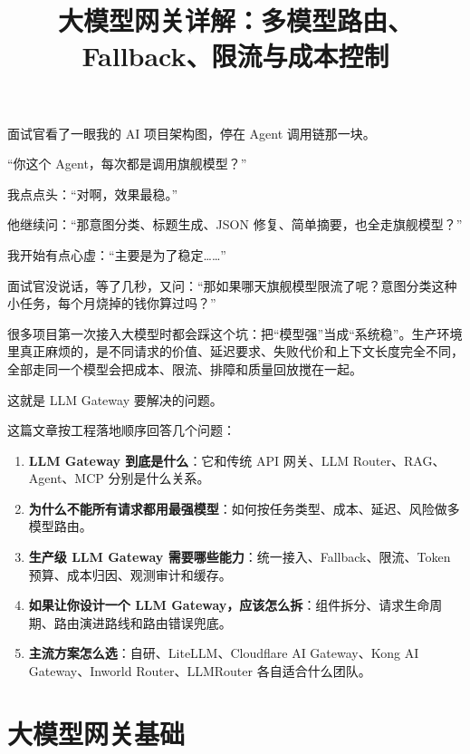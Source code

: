 \documentclass[10pt,a4paper]{ctexart}
\begin{document}
\title{大模型网关详解：多模型路由、Fallback、限流与成本控制}
\date{}
\maketitle

面试官看了一眼我的 AI 项目架构图，停在 Agent 调用链那一块。



“你这个 Agent，每次都是调用旗舰模型？”



我点点头：“对啊，效果最稳。”



他继续问：“那意图分类、标题生成、JSON 修复、简单摘要，也全走旗舰模型？”



我开始有点心虚：“主要是为了稳定……”



面试官没说话，等了几秒，又问：“那如果哪天旗舰模型限流了呢？意图分类这种小任务，每个月烧掉的钱你算过吗？”



很多项目第一次接入大模型时都会踩这个坑：把“模型强”当成“系统稳”。生产环境里真正麻烦的，是不同请求的价值、延迟要求、失败代价和上下文长度完全不同，全部走同一个模型会把成本、限流、排障和质量回放搅在一起。



这就是 LLM Gateway 要解决的问题。



这篇文章按工程落地顺序回答几个问题：


\begin{enumerate}[itemsep=2pt, topsep=4pt]
  \item \textbf{LLM Gateway 到底是什么}：它和传统 API 网关、LLM Router、RAG、Agent、MCP 分别是什么关系。
  \item \textbf{为什么不能所有请求都用最强模型}：如何按任务类型、成本、延迟、风险做多模型路由。
  \item \textbf{生产级 LLM Gateway 需要哪些能力}：统一接入、Fallback、限流、Token 预算、成本归因、观测审计和缓存。
  \item \textbf{如果让你设计一个 LLM Gateway，应该怎么拆}：组件拆分、请求生命周期、路由演进路线和路由错误兜底。
  \item \textbf{主流方案怎么选}：自研、LiteLLM、Cloudflare AI Gateway、Kong AI Gateway、Inworld Router、LLMRouter 各自适合什么团队。
\end{enumerate}


\section{大模型网关基础}
\end{document}
